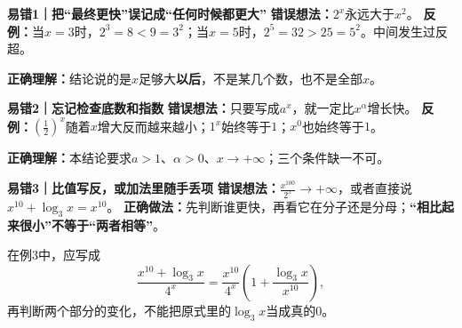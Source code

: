 \begin{trapbox}
	\textbf{\textcolor{CTrap}{易错1｜把“最终更快”误记成“任何时候都更大”}}
	\textbf{错误想法：}$2^x$永远大于$x^2$。
	\textbf{反例：}当$x=3$时，$2^3=8<9=3^2$；当$x=5$时，$2^5=32>25=5^2$。中间发生过反超。
	\begin{center}
	
	\end{center}
	\textbf{正确理解：}结论说的是$x$足够大\textbf{以后}，不是某几个数，也不是全部$x$。

	\medskip
	\textbf{\textcolor{CTrap}{易错2｜忘记检查底数和指数}}
	\textbf{错误想法：}只要写成$a^x$，就一定比$x^\alpha$增长快。
	\textbf{反例：}$(\tfrac12)^x$随着$x$增大反而越来越小；$1^x$始终等于$1$；$x^0$也始终等于$1$。
	\begin{center}
	
	\end{center}
	\textbf{正确理解：}本结论要求$a>1$、$\alpha>0$、$x\to+\infty$；三个条件缺一不可。

	\medskip
	\textbf{\textcolor{CTrap}{易错3｜比值写反，或加法里随手丢项}}
	\textbf{错误想法：}$\frac{x^{100}}{2^x}\to+\infty$，或者直接说$x^{10}+\log_3x=x^{10}$。
	\textbf{正确做法：}先判断谁更快，再看它在分子还是分母；\textbf{“相比起来很小”不等于“两者相等”}。
	\begin{center}
	
	\end{center}
	在例3中，应写成
	\[
		\frac{x^{10}+\log_3x}{4^x}
		=\frac{x^{10}}{4^x}\left(1+\frac{\log_3x}{x^{10}}\right),
	\]
	再判断两个部分的变化，不能把原式里的$\log_3x$当成真的$0$。
\end{trapbox}
